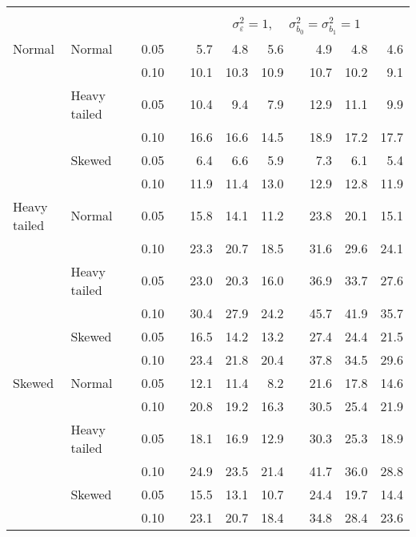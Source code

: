 \begin{table}[ht]
\begin{scriptsize}
\begin{center}
\begin{tabular}{ll p{.1cm} c p{.1cm} rrr p{.1cm} rrr}
&&&&&&&&&&&\\
& && && \multicolumn{7}{c}{$\sigma_{\varepsilon}^2 = 1$, \ \ $\sigma_{b_0}^2 = \sigma_{b_1}^2 = 1$} \\ \cline{6-12}
Normal       & Normal       && 0.05 &&   5.7 & 4.8 & 5.6 &   & 4.9 & 4.8 & 4.6 \\ 
             &              && 0.10 &&   10.1 & 10.3 & 10.9 &   & 10.7 & 10.2 & 9.1 \\ 
             & Heavy tailed && 0.05 &&   10.4 & 9.4 & 7.9 &   & 12.9 & 11.1 & 9.9 \\ 
             &              && 0.10 &&   16.6 & 16.6 & 14.5 &   & 18.9 & 17.2 & 17.7 \\ 
             & Skewed       && 0.05 &&   6.4 & 6.6 & 5.9 &   & 7.3 & 6.1 & 5.4 \\ 
             &              && 0.10 &&   11.9 & 11.4 & 13.0 &   & 12.9 & 12.8 & 11.9 \\ 
Heavy tailed & Normal       && 0.05 &&   15.8 & 14.1 & 11.2 &   & 23.8 & 20.1 & 15.1 \\ 
             &              && 0.10 &&   23.3 & 20.7 & 18.5 &   & 31.6 & 29.6 & 24.1 \\ 
             & Heavy tailed && 0.05 &&   23.0 & 20.3 & 16.0 &   & 36.9 & 33.7 & 27.6 \\ 
             &              && 0.10 &&   30.4 & 27.9 & 24.2 &   & 45.7 & 41.9 & 35.7 \\ 
             & Skewed       && 0.05 &&   16.5 & 14.2 & 13.2 &   & 27.4 & 24.4 & 21.5 \\ 
             &              && 0.10 &&   23.4 & 21.8 & 20.4 &   & 37.8 & 34.5 & 29.6 \\ 
Skewed       & Normal       && 0.05 &&   12.1 & 11.4 & 8.2 &   & 21.6 & 17.8 & 14.6 \\ 
             &              && 0.10 &&   20.8 & 19.2 & 16.3 &   & 30.5 & 25.4 & 21.9 \\ 
             & Heavy tailed && 0.05 &&   18.1 & 16.9 & 12.9 &   & 30.3 & 25.3 & 18.9 \\ 
             &              && 0.10 &&   24.9 & 23.5 & 21.4 &   & 41.7 & 36.0 & 28.8 \\ 
             & Skewed       && 0.05 &&   15.5 & 13.1 & 10.7 &   & 24.4 & 19.7 & 14.4 \\ 
             &              && 0.10 &&   23.1 & 20.7 & 18.4 &   & 34.8 & 28.4 & 23.6 \\ 


\end{tabular}
\end{center}
\end{scriptsize}
\end{table}
